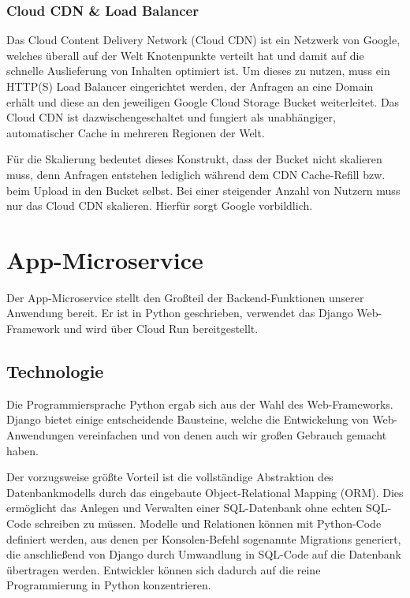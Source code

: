 \documentclass{article}
\begin{document}
\subsubsection{Cloud CDN \& Load Balancer}

Das Cloud Content Delivery Network (Cloud CDN) ist ein Netzwerk von Google, welches überall auf der Welt Knotenpunkte verteilt hat und damit auf die schnelle Auslieferung von Inhalten optimiert ist. Um dieses zu nutzen, muss ein HTTP(S) Load Balancer eingerichtet werden, der Anfragen an eine Domain erhält und diese an den jeweiligen Google Cloud Storage Bucket weiterleitet. Das Cloud CDN ist dazwischengeschaltet und fungiert als unabhängiger, automatischer Cache in mehreren Regionen der Welt.

Für die Skalierung bedeutet dieses Konstrukt, dass der Bucket nicht skalieren muss, denn Anfragen entstehen lediglich während dem CDN Cache-Refill bzw. beim Upload in den Bucket selbst. Bei einer steigender Anzahl von Nutzern muss nur das Cloud CDN skalieren. Hierfür sorgt Google vorbildlich.


\section{App-Microservice} %
\label{sec:app-microservice}

Der App-Microservice stellt den Großteil der Backend-Funktionen unserer Anwendung bereit. Er ist in Python geschrieben, verwendet das Django Web-Framework und wird über Cloud Run bereitgestellt.


\subsection{Technologie}
\label{sec:app-tech}

Die Programmiersprache Python ergab sich aus der Wahl des Web-Frameworks. Django bietet einige entscheidende Bausteine, welche die Entwickelung von Web-Anwendungen vereinfachen und von denen auch wir großen Gebrauch gemacht haben. 

Der vorzugsweise größte Vorteil ist die vollständige Abstraktion des Datenbankmodells durch das eingebaute Object-Relational Mapping (ORM). Dies ermöglicht das Anlegen und Verwalten einer SQL-Datenbank ohne echten SQL-Code schreiben zu müssen. Modelle und Relationen können mit Python-Code definiert werden, aus denen per Konsolen-Befehl sogenannte Migrations generiert, die anschließend von Django durch Umwandlung in SQL-Code auf die Datenbank übertragen werden. Entwickler können sich dadurch auf die reine Programmierung in Python konzentrieren. 
\end{document}
